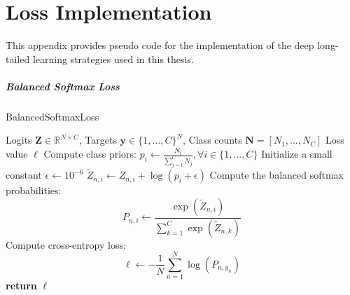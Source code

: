 \chapter{Loss Implementation}
\label{app:implementation}
This appendix provides pseudo code for the implementation of the deep long-tailed learning strategies used in this thesis.

\paragraph{Balanced Softmax Loss}
\begin{algorithm}
    \caption{BalancedSoftmaxLoss}\label{alg:balanced_softmax_loss}
    \begin{algorithmic}[1]
    \Require Logits $\mathbf{Z} \in \mathbb{R}^{N \times C}$, Targets $\mathbf{y} \in \{1,\dots,C\}^N$, Class counts $\mathbf{N} = [N_1, \dots, N_C]$
    \Ensure Loss value $\ell$
    \State Compute class priors: $p_i \gets \frac{N_i}{\sum_{j=1}^{C} N_j}, \forall i \in \{1, \dots, C\}$
    \State Initialize a small constant $\epsilon \gets 10^{-6}$
            \State $\widetilde{Z}_{n,i} \gets Z_{n,i} + \log(p_i + \epsilon)$
        \EndFor
    \EndFor
    \State Compute the balanced softmax probabilities:
    \[
        P_{n,i} \gets \frac{\exp(\widetilde{Z}_{n,i})}{\sum_{k=1}^C \exp(\widetilde{Z}_{n,k})}
    \]
    \State Compute cross-entropy loss:
    \[
        \ell \gets -\frac{1}{N}\sum_{n=1}^{N} \log(P_{n,y_n})
    \]
    \State \textbf{return} $\ell$
    \end{algorithmic}
\end{algorithm}